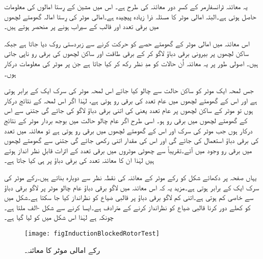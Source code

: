یہ معائنہ ٹرانسفارمر کے کسرِ دور معائنہ کی طرح ہے۔ اس میں مشین کے رِستا امالوں کی معلومات حاصل ہوتی ہے۔البتہ امالی موٹر کا مسئلہ ذرا زیادہ پیچیدہ ہے۔امالی موٹر کی رِستا امالہ گھومتے لچھوں میں برقی تعدد اور قالب کے سیراب ہونے پر منحصر ہوتے ہیں۔

 اس معائنہ میں امالی موٹر کے گھومتے حصے کو حرکت کرنے سے زبردستی روک دیا جاتا ہے جبکہ ساکن لچھوں پر بیرونی برقی دباؤ  لاگو کر کے برقی طاقت  اور ساکن لچھوں کی برقی رو  ناپی جاتی ہیں۔ اصولی طور پر یہ معائنہ اُن حالات کو مدِ نظر رکھ کر کیا جاتا ہے جن پر موٹر کی معلومات درکار ہوں۔

جس لمحہ ایک موٹر کو ساکن حالت سے چالو کیا جائے اس لمحہ موٹر کی سرک ایک کے برابر ہوتی ہے اور اس کے گھومتے لچھوں میں عام تعدد   کی برقی رو  ہوتی ہے، لہٰذا اگر اس لمحہ کے نتائج درکار ہوں تو موٹر کے ساکن لچھوں پر عام تعدد یعنی   کی اتنی برقی دباؤ لاگو کی جائے گی جتنی سے اس کے گھومتے لچھوں میں برقی رو  ہو۔ اسی طرح اگر عام چالو حالت میں بوجھ بردار موٹر کے نتائج درکار ہوں جب موٹر کی سرک  اور اس کے گھومتے لچھوں میں برقی رو  ہوتی ہے تو معائنہ میں  تعدد کی برقی دباؤ استعمال کی جائے گی اور اس کی مقدار اتنی رکھی جائے گی جتنی سے گھومتے لچھوں میں  برقی رو وجود میں آئے۔تقریباً   سے چھوٹی موٹروں میں برقی تعدد کے اثرات قابلِ نظر انداز ہوتے ہیں لہٰذا ان کا معائنہ  تعدد کی برقی دباؤ پر ہی کیا جاتا ہے۔

یہاں صفحہ  پر دکھائے شکل   کو رکے موٹر کے معائنہ کی نقطہ نظر سے دوبارہ بناتے ہیں۔رکے موٹر کی سرک ایک کے برابر ہوتی ہے۔مزید یہ کہ اس معائنہ میں لاگو برقی دباؤ عام چالو موٹر پر لاگو برقی دباؤ سے خاصی کم ہوتی ہے۔اتنی کم لاگو برقی دباؤ پر قالبی ضیاع کو نظرانداز کیا جا سکتا ہے۔شکل میں   کو کھلے دور کرنا قالبی ضیاع کو نظرانداز کرنے کے مترادف ہے۔ایسا کرنے سے شکل -الف ملتا ہے۔چونکہ  ہے لہٰذا اس شکل میں   کو  لیا گیا ہے۔
\begin{figure}
\centering
\texttt{[image: figInductionBlockedRotorTest]}
\caption{رکے امالی موٹر کا معائنہ۔}
\label{شکل_امالی_رکے_موٹر_معائنہ}
\end{figure}

